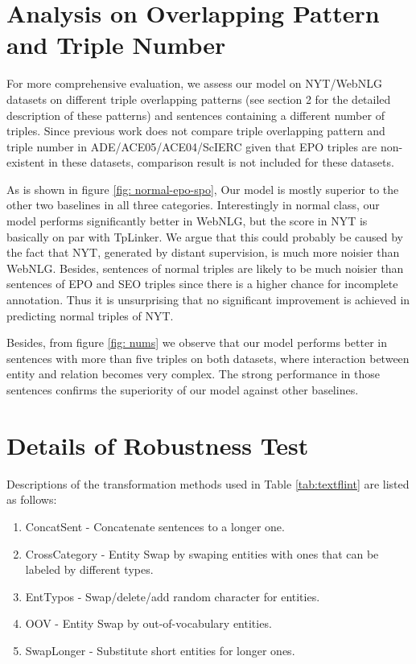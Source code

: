 \documentclass[11pt]{article}
\begin{document}
\section{Analysis on Overlapping Pattern and Triple Number}
For more comprehensive evaluation, we assess our model on NYT/WebNLG datasets on different triple overlapping patterns (see section 2 for the detailed description of these patterns) and sentences containing a different number of triples. Since previous work does not compare triple overlapping pattern and triple number in ADE/ACE05/ACE04/ScIERC given that EPO triples are non-existent in these datasets, comparison result is not included for these datasets.

As is shown in figure \ref{fig: normal-epo-spo}, Our model is mostly superior to the other two baselines in all three categories.  Interestingly in normal class, our model performs significantly better in WebNLG, but the score in NYT is basically on par with TpLinker. We argue that this could probably be caused by the fact that NYT, generated by distant supervision, is much more noisier than WebNLG. Besides, sentences of normal triples are likely to be much noisier than sentences of EPO and SEO triples since there is a higher chance for incomplete annotation. Thus it is unsurprising that no significant improvement is achieved in predicting normal triples of NYT. 

Besides, from figure \ref{fig: nums} we observe that our model performs better in sentences with more than five triples on both datasets, where interaction between entity and relation becomes very complex. The strong performance in those sentences confirms the superiority of our model against other baselines.


\section{Details of Robustness Test}
\label{sec B}
Descriptions of the transformation methods used in Table \ref{tab:textflint} are listed as follows:
\begin{enumerate}
\vspace{-2.5mm}
\item ConcatSent - Concatenate sentences to a longer one.
\vspace{-2.5mm}
\item CrossCategory - Entity Swap by swaping entities with ones that can be labeled by different types.
\vspace{-2.5mm}
\item EntTypos - Swap/delete/add random character for entities.
\vspace{-2.5mm}
\item OOV - Entity Swap by out-of-vocabulary entities.
\vspace{-2.5mm}
\item SwapLonger - Substitute short entities for longer ones.
\end{enumerate}
\end{document}

